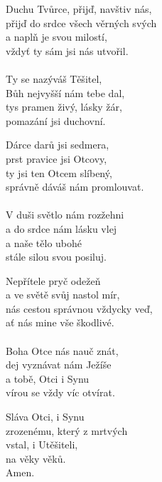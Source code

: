 \begin{translatioMulticol}{4}
Duchu Tvůrce, přijď, navštiv nás,\\
přijď do srdce všech věrných svých\\
a naplň je svou milostí,\\
vždyť ty sám jsi nás utvořil.\\
\\
Ty se nazýváš Těšitel,\\
Bůh nejvyšší nám tebe dal,\\
tys pramen živý, lásky žár,\\
pomazání jsi duchovní.\columnbreak

Dárce darů jsi sedmera,\\
prst pravice jsi Otcovy,\\
ty jsi ten Otcem slíbený,\\
správně dáváš nám promlouvat.\\
\\
V duši světlo nám rozžehni\\
a do srdce nám lásku vlej\\
a naše tělo ubohé\\
stále silou svou posiluj.\columnbreak

Nepřítele pryč odežeň\\
a ve světě svůj nastol mír,\\
nás cestou správnou vždycky veď,\\
ať nás mine vše škodlivé.\\
\\
Boha Otce nás nauč znát,\\
dej vyznávat nám Ježíše\\
a tobě, Otci i Synu\\
vírou se vždy víc otvírat.\columnbreak

Sláva Otci, i Synu\\
zrozenému, který z mrtvých\\
vstal, i Utěšiteli,\\
na věky věků.\\
Amen.
\end{translatioMulticol}
